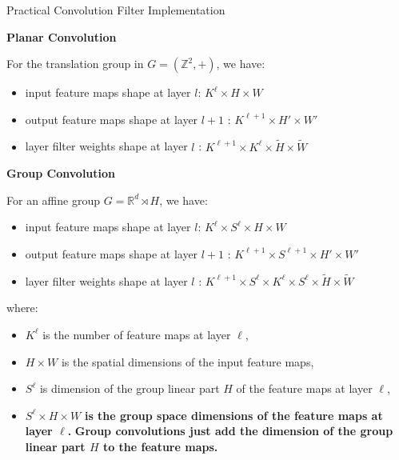 \documentclass[9pt,dvipsnames]{beamer}
\begin{document}
\begin{frame}{Practical Convolution Filter Implementation}

	\textbf{Planar Convolution}

	For the translation group in $G = (\mathbb{Z}^2, +)$, we have:

	\begin{itemize}
		\item input feature maps shape at layer $l$: $K^\ell \times H \times W$
		\item output feature maps shape at layer $l+1$ : $K^{\ell+1} \times H' \times W'$
		\item layer filter weights shape at layer $l$ : $K^{\ell+1} \times K^\ell \times \tilde{H} \times \tilde{W}$
	\end{itemize}

	\textbf{Group Convolution}

	For an affine group $G = \mathbb{R}^d \rtimes H$, we have:

	\begin{itemize}
		\item input feature maps shape at layer $l$: $K^\ell \times S^{\ell} \times H \times W$
		\item output feature maps shape at layer $l+1$ : $K^{\ell+1} \times S^{\ell + 1} \times H' \times W'$
		\item layer filter weights shape at layer $l$ : $K^{\ell+1} \times S^{\ell} \times K^\ell \times S^{\ell} \times \tilde{H} \times \tilde{W}$
	\end{itemize}

	where:
	\begin{itemize}
		\item $K^\ell$ is the number of feature maps at layer $\ell$,
		\item $H \times W$ is the spatial dimensions of the input feature maps,
		\item $S^\ell$ is dimension of the group linear part $H$ of the feature maps at layer $\ell$,
		\item $S^\ell \times H \times W$ {\bf is the group space dimensions of the feature maps at layer $\ell$.} {\color{red} \bf Group convolutions just add the dimension of the group linear part $H$ to the feature maps.}
	\end{itemize}

\end{frame}
\end{document}
